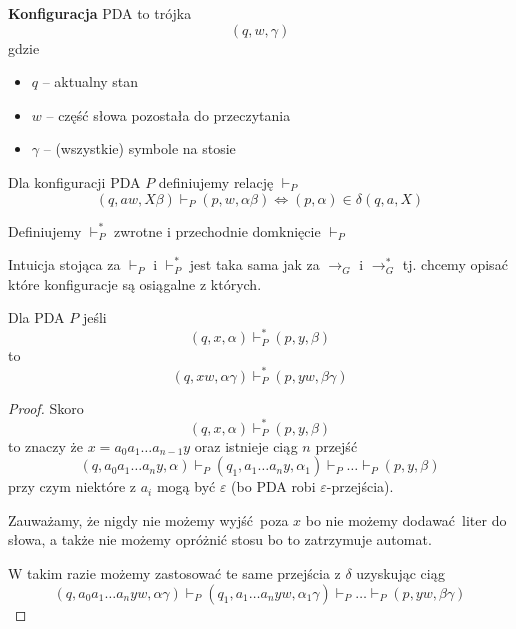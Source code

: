 \begin{definition}
	\textbf{Konfiguracja} PDA to trójka
	\[
		(q, w, \gamma)
	\]
	gdzie
	\begin{itemize}
		\item \( q \) -- aktualny stan
		\item \( w \) -- część słowa pozostała do przeczytania
		\item \( \gamma \) -- (wszystkie) symbole na stosie
	\end{itemize}
\end{definition}

\begin{definition}
	Dla konfiguracji PDA \( P \) definiujemy relację \( \vdash_P \)
	\[
		(q, aw, X\beta) \vdash_P (p, w, \alpha \beta)
		\iff
		(p, \alpha) \in \delta(q, a, X)
	\]
\end{definition}

\begin{definition}
	Definiujemy \( \vdash_P^* \) zwrotne i przechodnie domknięcie \( \vdash_P \)
\end{definition}

Intuicja stojąca za \( \vdash_P \) i \( \vdash_P^* \) jest taka sama jak za \( \rightarrow_G \) i \( \rightarrow_G^* \) tj. chcemy opisać które konfiguracje są osiągalne z których.

\begin{lemma}
	\label{pda-stack-extending-lemma}
	Dla PDA \( P \) jeśli
	\[
		(q, x, \alpha) \vdash_P^* (p, y, \beta)
	\]
	to
	\[
		(q, xw, \alpha\gamma) \vdash_P^* (p, yw, \beta\gamma)
	\]
\end{lemma}
\begin{proof}
	Skoro
	\[
		(q, x, \alpha) \vdash_P^* (p, y, \beta)
	\]
	to znaczy że \( x = a_0a_1\dots a_{n-1}y \) oraz istnieje ciąg \( n \) przejść
	\[
		(q, a_0a_1\dots a_ny, \alpha) \vdash_P (q_1, a_1\dots a_ny, \alpha_1) \vdash_P \dots
		\vdash_P (p, y, \beta)
	\]
	przy czym niektóre z \( a_i \) mogą być \( \varepsilon \) (bo PDA robi \(\varepsilon\)-przejścia).

	Zauważamy, że nigdy nie możemy wyjść poza \( x \) bo nie możemy dodawać liter do słowa, a także nie możemy opróżnić stosu bo to zatrzymuje automat.

	W takim razie możemy zastosować te same przejścia z \( \delta \) uzyskując ciąg
	\[
		(q, a_0a_1\dots a_nyw, \alpha\gamma) \vdash_P (q_1, a_1\dots a_nyw, \alpha_1\gamma) \vdash_P \dots
		\vdash_P (p, yw, \beta\gamma)
	\]
\end{proof}

